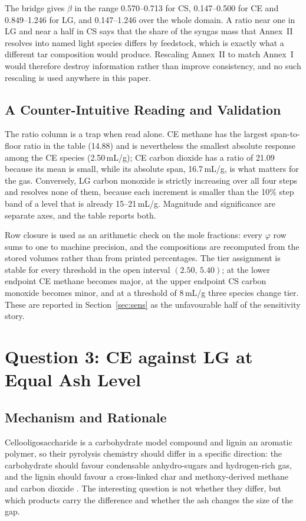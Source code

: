 \documentclass[withoutpreface,bwprint]{apmcmthesis}
\begin{document}
The bridge gives $\beta$ in the range 0.570--0.713 for CS, 0.147--0.500 for CE and 0.849--1.246 for LG, and 0.147--1.246 over the whole domain. A ratio near one in LG and near a half in CS says that the share of the syngas mass that Annex~II resolves into named light species differs by feedstock, which is exactly what a different tar composition would produce. Rescaling Annex~II to match Annex~I would therefore destroy information rather than improve consistency, and no such rescaling is used anywhere in this paper.

\subsection{A Counter-Intuitive Reading and Validation}
The ratio column is a trap when read alone. CE methane has the largest span-to-floor ratio in the table (14.88) and is nevertheless the smallest absolute response among the CE species (2.50\,mL/g); CE carbon dioxide has a ratio of 21.09 because its mean is small, while its absolute span, 16.7\,mL/g, is what matters for the gas. Conversely, LG carbon monoxide is strictly increasing over all four steps and resolves none of them, because each increment is smaller than the 10\% step band of a level that is already 15--21\,mL/g. Magnitude and significance are separate axes, and the table reports both.

Row closure is used as an arithmetic check on the mole fractions: every $\varphi$ row sums to one to machine precision, and the compositions are recomputed from the stored volumes rather than from printed percentages. The tier assignment is stable for every threshold in the open interval $(2.50,\,5.40)$; at the lower endpoint CE methane becomes major, at the upper endpoint CS carbon monoxide becomes minor, and at a threshold of 8\,mL/g three species change tier. These are reported in Section~\ref{sec:sens} as the unfavourable half of the sensitivity story.

\section{Question 3: CE against LG at Equal Ash Level}
\label{sec:q3}
\subsection{Mechanism and Rationale}
Cellooligosaccharide is a carbohydrate model compound and lignin an aromatic polymer, so their pyrolysis chemistry should differ in a specific direction: the carbohydrate should favour condensable anhydro-sugars and hydrogen-rich gas, and the lignin should favour a cross-linked char and methoxy-derived methane and carbon dioxide \cite{Bridgwater2012,Czernik2004}. The interesting question is not whether they differ, but which products carry the difference and whether the ash changes the size of the gap.
\end{document}
